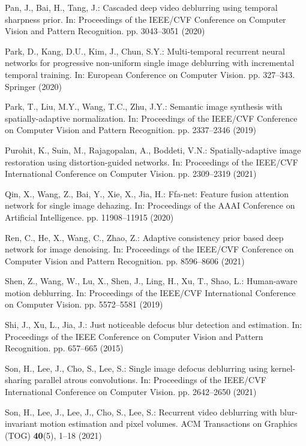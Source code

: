 \documentclass[runningheads]{llncs}
\begin{document}
\begin{thebibliography}{10}
Pan, J., Bai, H., Tang, J.: Cascaded deep video deblurring using temporal
  sharpness prior. In: Proceedings of the IEEE/CVF Conference on Computer
  Vision and Pattern Recognition. pp. 3043--3051 (2020)

Park, D., Kang, D.U., Kim, J., Chun, S.Y.: Multi-temporal recurrent neural
  networks for progressive non-uniform single image deblurring with incremental
  temporal training. In: European Conference on Computer Vision. pp. 327--343.
  Springer (2020)

Park, T., Liu, M.Y., Wang, T.C., Zhu, J.Y.: Semantic image synthesis with
  spatially-adaptive normalization. In: Proceedings of the IEEE/CVF Conference
  on Computer Vision and Pattern Recognition. pp. 2337--2346 (2019)

Purohit, K., Suin, M., Rajagopalan, A., Boddeti, V.N.: Spatially-adaptive image
  restoration using distortion-guided networks. In: Proceedings of the IEEE/CVF
  International Conference on Computer Vision. pp. 2309--2319 (2021)

Qin, X., Wang, Z., Bai, Y., Xie, X., Jia, H.: Ffa-net: Feature fusion attention
  network for single image dehazing. In: Proceedings of the AAAI Conference on
  Artificial Intelligence. pp. 11908--11915 (2020)

Ren, C., He, X., Wang, C., Zhao, Z.: Adaptive consistency prior based deep
  network for image denoising. In: Proceedings of the IEEE/CVF Conference on
  Computer Vision and Pattern Recognition. pp. 8596--8606 (2021)

Shen, Z., Wang, W., Lu, X., Shen, J., Ling, H., Xu, T., Shao, L.: Human-aware
  motion deblurring. In: Proceedings of the IEEE/CVF International Conference
  on Computer Vision. pp. 5572--5581 (2019)

Shi, J., Xu, L., Jia, J.: Just noticeable defocus blur detection and
  estimation. In: Proceedings of the IEEE Conference on Computer Vision and
  Pattern Recognition. pp. 657--665 (2015)

Son, H., Lee, J., Cho, S., Lee, S.: Single image defocus deblurring using
  kernel-sharing parallel atrous convolutions. In: Proceedings of the IEEE/CVF
  International Conference on Computer Vision. pp. 2642--2650 (2021)

Son, H., Lee, J., Lee, J., Cho, S., Lee, S.: Recurrent video deblurring with
  blur-invariant motion estimation and pixel volumes. ACM Transactions on
  Graphics (TOG)  \textbf{40}(5),  1--18 (2021)


\end{thebibliography}
\end{document}
